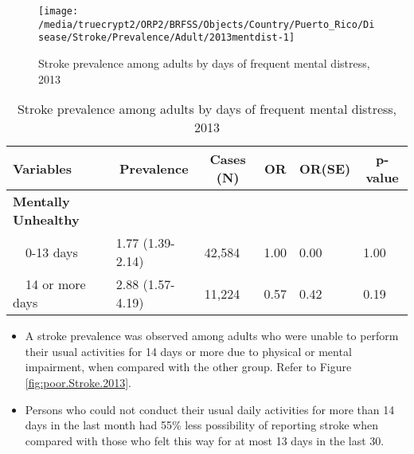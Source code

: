 \begin{figure}[H]
\centering
\caption{Stroke prevalence among adults by days of frequent mental distress, 2013}
\label{fig:mental.Stroke.2013}

\begin{knitrout}
\color{fgcolor}

{\centering \texttt{[image: /media/truecrypt2/ORP2/BRFSS/Objects/Country/Puerto\_Rico/Disease/Stroke/Prevalence/Adult/2013mentdist-1]} 

}



\end{knitrout}
 \end{figure}

\begin{table}[H]
\caption{Stroke prevalence among adults by days of frequent mental distress, 2013\label{tab:mental.Stroke.2013}} 
\begin{center}
\begin{tabular}{llllll}
\hline\hline
\multicolumn{1}{l}{Variables}&\multicolumn{1}{c}{Prevalence}&\multicolumn{1}{c}{Cases (N)}&\multicolumn{1}{c}{OR}&\multicolumn{1}{c}{OR(SE)}&\multicolumn{1}{c}{p-value}\tabularnewline
\hline
{\bfseries Mentally Unhealthy}&&&&&\tabularnewline
~~0-13 days&1.77 (1.39-2.14)&42,584&1.00&0.00&1.00\tabularnewline
~~14 or more days&2.88 (1.57-4.19)&11,224&0.57&0.42&0.19\tabularnewline
\hline
\end{tabular}\end{center}

\end{table}



 \newpage
\begin{itemize}

\item A  
stroke prevalence was observed among adults who were unable to perform their usual activities for 14 days or more due to physical or mental impairment, when compared with the other group. Refer to Figure \ref{fig:poor.Stroke.2013}.



\item Persons who could not conduct their usual daily activities for more than 14 days in the last month had 55\% less possibility of reporting stroke when compared with those who felt this way for at most 13 days in the last 30.

\end{itemize}

